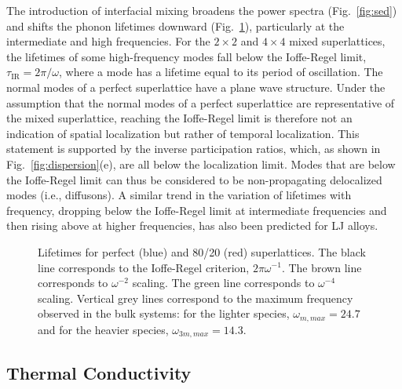 \documentclass[aps,prb,preprint,preprintnumbers,amsmath,amssymb,floatfix,superscriptaddress]{revtex4}
\begin{document}
The introduction of interfacial mixing broadens the power spectra (Fig.~\ref{fig:sed}) and shifts the phonon lifetimes downward (Fig.~\ref{FIG:lifetime}), particularly at the intermediate and high frequencies. For the $2 \times 2$ and $ 4 \times 4$ mixed superlattices,  the lifetimes of some high-frequency modes fall below the Ioffe-Regel limit, $\tau_\mathrm{IR} =2\pi/\omega$, where a mode has a lifetime equal to its period of oscillation. The normal modes of a perfect superlattice have a plane wave structure. Under the assumption that the normal modes of a perfect superlattice are representative of the mixed superlattice, reaching the Ioffe-Regel limit is therefore not an indication of spatial localization but rather of temporal localization. This statement is supported by the inverse participation ratios, which, as shown in Fig.~\ref{fig:dispersion}(e), are all below the localization limit. Modes that are below the Ioffe-Regel limit can thus be considered to be non-propagating delocalized modes (i.e., diffusons).\cite{allen_thermal_1993,allen1999diffusons} A similar trend in the variation of lifetimes with frequency, dropping below the Ioffe-Regel limit at intermediate frequencies and then rising above at higher frequencies, has also been predicted for LJ alloys.\cite{larkin2013predicting} 

\renewcommand{\textfraction}{0.0}
\begin{figure}%
\begin{center}
\renewcommand{\figure}{Fig.}
\caption{Lifetimes for perfect (blue) and 80/20 (red) superlattices. The black line corresponds to the Ioffe-Regel criterion, $2\pi\omega^{-1}$. The brown line corresponds to $\omega^{-2}$ scaling. The green line corresponds to $\omega^{-4}$ scaling. Vertical grey lines correspond to the maximum frequency observed in the bulk systems: for the lighter species, $\omega_{m,max}=24.7$ and for the heavier species, $\omega_{3m,max}=14.3$. } 
\label{FIG:lifetime}
\end{center}
\end{figure}

\subsection{Thermal Conductivity}
\end{document}
